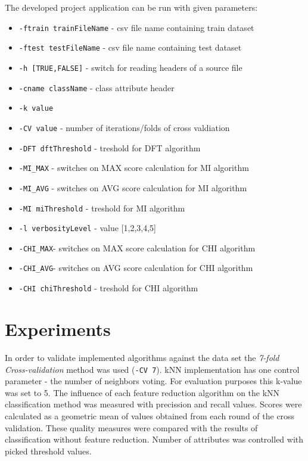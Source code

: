 \documentclass[12pt,a4paper]{report}
\begin{document}
The developed project application can be run with given parameters:
\begin{itemize}
  \item \texttt{-ftrain trainFileName} - csv file name containing train dataset
  \item \texttt{-ftest testFileName} - csv file name containing test dataset
  \item \texttt{-h [TRUE,FALSE]} - switch for reading headers of a source file
  \item \texttt{-cname className} - class attribute header
  \item \texttt{-k value}
  \item \texttt{-CV value} - number of iterations/folds of cross valdiation
  \item \texttt{-DFT dftThreshold} - treshold for DFT algorithm
  \item \texttt{-MI\_MAX} - switches on MAX score calculation for MI algorithm
  \item \texttt{-MI\_AVG} - switches on AVG score calculation for MI algorithm
  \item \texttt{-MI miThreshold} - treshold for MI algorithm
  \item \texttt{-l verbosityLevel}  - value [1,2,3,4,5]
  \item \texttt{-CHI\_MAX}- switches on MAX score calculation for CHI algorithm
  \item \texttt{-CHI\_AVG}- switches on AVG score calculation for CHI algorithm
  \item \texttt{-CHI chiThreshold} - treshold for CHI algorithm
\end{itemize}

\chapter{Experiments}

In order to validate implemented algorithms against the data set the \emph{7-fold Cross-validation} method was used (\texttt{-CV 7}). kNN implementation has one control parameter - the number of neighbors voting. For evaluation purposes this k-value was set to 5.
The influence of each feature reduction algorithm on the kNN classification method was measured with precission and recall values. Scores were calculated as a geometric mean of values obtained from each round of the cross validation.  These quality measures were compared with the results of classification without feature reduction. Number of attributes was controlled with picked threshold values.
\end{document}
